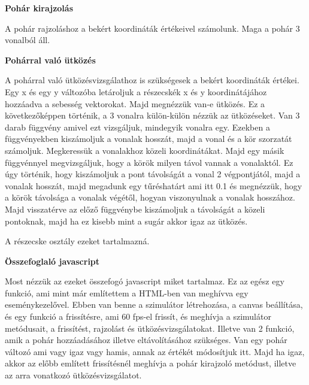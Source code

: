 \textbf{Pohár kirajzolás}

A pohár rajzoláshoz a bekért koordináták értékeivel számolunk. Maga a pohár 3 vonalból áll. 


\textbf{Pohárral való ütközés}

A pohárral való ütközésvizsgálathoz is szükségesek a bekért koordináták értékei. Egy x és egy y változóba letároljuk a részecskék x és y koordinátájához hozzáadva a sebesség vektorokat. Majd megnézzük van-e ütközés. Ez a következőképpen történik, a 3 vonalra külön-külön nézzük az ütközéseket. Van 3 darab függvény amivel ezt vizsgáljuk, mindegyik vonalra egy. Ezekben a függvényekben kiszámoljuk a vonalak hosszát, majd a vonal és a kör szorzatát számoljuk. Megkeressük a vonalakhoz közeli koordinátákat. Majd egy másik függvénnyel megvizsgáljuk, hogy a körök milyen távol vannak a vonalaktól. Ez úgy történik, hogy kiszámoljuk a pont távolságát a vonal 2 végpontjától, majd a vonalak hosszát, majd megadunk egy tűréshatárt ami itt 0.1 és megnézzük, hogy a körök távolsága a vonalak végétől, hogyan viszonyulnak a vonalak hosszához. Majd visszatérve az előző függvénybe kiszámoljuk a távolságát a közeli pontoknak, majd ha ez kisebb mint a sugár akkor igaz az ütközés. 


A részecske osztály ezeket tartalmazná. 

\textbf{Összefoglaló javascript}

Most nézzük az ezeket összefogó javascript miket tartalmaz. Ez az egész egy funkció, ami mint már említettem a HTML-ben van meghívva egy eseménykezelővel. Ebben van benne a szimulátor létrehozása, a canvas beállítása, és egy funkció a frissítésre, ami 60 fps-el frissít, és meghívja a szimulátor metódusait, a frissítést, rajzolást és ütközésvizsgálatokat. Illetve van 2 funkció, amik a pohár hozzáadásához illetve eltávolításához szükséges. Van egy pohár változó ami vagy igaz vagy hamis, annak az értékét módosítjuk itt. Majd ha igaz, akkor az előbb említett frissítésnél meghívja a pohár kirajzoló metódust, illetve az arra vonatkozó ütközésvizsgálatot.  

